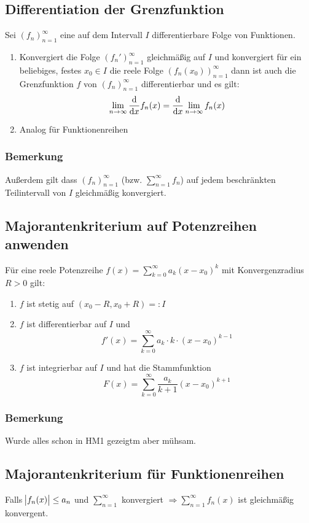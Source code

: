 \subsection{Differentiation der Grenzfunktion}
Sei ${(f_n)}_{n=1}^\infty$ eine auf dem Intervall $I$ differentierbare Folge von
Funktionen.
\begin{enumerate}[label= (\alph*)]
    \item Konvergiert die Folge ${(f_n')}_{n=1}^\infty$ gleichmäßig auf $I$ und konvergiert
    für ein beliebiges, festes $x_0 \in I$ die reele Folge ${(f_n(x_0))}_{n=1}^\infty$
    dann ist auch die Grenzfunktion $f$ von ${(f_n)}_{n=1}^\infty$ differentierbar
    und es gilt:
    \begin{equation*}
        \lim_{n \rightarrow \infty} \dfrac{\text{d}}{\text{d}x} f_n(x) = \dfrac{\text{d}}{\text{d}x} \lim_{n \rightarrow \infty} f_n(x)
    \end{equation*}
    \item Analog für Funktionenreihen
\end{enumerate}

\subsubsection{Bemerkung}
Außerdem gilt dass ${(f_n)}_{n=1}^\infty$ (bzw. $\sum_{n=1}^\infty f_n$) auf jedem
beschränkten Teilintervall von $I$ gleichmäßig konvergiert.

\subsection{Majorantenkriterium auf Potenzreihen anwenden}
Für eine reele Potenzreihe $f(x) = \sum_{k=0}^\infty a_k {(x-x_0)}^k$ mit
Konvergenzradius $R > 0$ gilt:
\begin{enumerate}[label= (\alph*)]
    \item $f$ ist stetig auf $(x_0 - R, x_0 + R) =: I$
    \item $f$ ist differentierbar auf $I$ und
        \begin{equation*}
            f'(x) = \sum_{k=0}^\infty a_k \cdot k \cdot {(x-x_0)}^{k-1}
        \end{equation*}
    \item $f$ ist integrierbar auf $I$ und hat die Stammfunktion
        \begin{equation*}
            F(x) = \sum_{k=0}^\infty \frac{a_k}{k+1} {(x-x_0)}^{k+1}
        \end{equation*}
\end{enumerate}

\subsubsection{Bemerkung}
Wurde alles schon in HM1 gezeigtm aber mühsam.

\subsection{Majorantenkriterium für Funktionenreihen}
Falls $\abs{f_n(x)} \leq a_n$ und $\sum_{n=1}^\infty$ konvergiert
$\Rightarrow \sum_{n=1}^\infty f_n(x)$ ist gleichmäßig konvergent.
